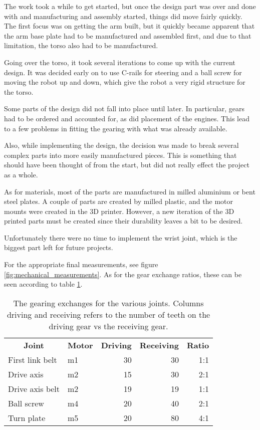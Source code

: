 The work took a while to get started, but once the design part was over and done with and manufacturing and assembly started, things did move fairly quickly. The first focus was on getting the arm built, but it quickly became apparent that the arm base plate had to be manufactured and assembled first, and due to that limitation, the torso also had to be manufactured.

Going over the torso, it took several iterations to come up with the current design. It was decided early on to use C-rails for steering and a ball screw for moving the robot up and down, which give the robot a very rigid structure for the torso. 

Some parts of the design did not fall into place until later. In particular, gears had to be ordered and accounted for, as did placement of the engines. This lead to a few problems in fitting the gearing with what was already available.

Also, while implementing the design, the decision was made to break several complex parts into more easily manufactured pieces. This is something that should have been thought of from the start, but did not really effect the project as a whole.

As for materials, most of the parts are manufactured in milled aluminium or bent steel plates. A couple of parts are created by milled plastic, and the motor mounts were created in the 3D printer. However, a new iteration of the 3D printed parts must be created since their durability leaves a bit to be desired.

Unfortunately there were no time to implement the wrist joint, which is the biggest part left for future projects.

For the appropriate final measurements, see figure \ref{fig:mechanical_measurements}. As for the gear exchange ratios, these can be seen according to table \ref{table:gearing}.

\begin{table}[!ht]
    \centering
    \begin{tabular}{l l r r r}
        \multicolumn{1}{c}{\bfseries Joint} & \multicolumn{1}{c}{\bfseries Motor} & \multicolumn{1}{c}{\bfseries Driving} & \multicolumn{1}{c}{\bfseries Receiving} & \multicolumn{1}{c}{\bfseries Ratio} \\ %
        First link belt & m1 & 30 & 30 & 1:1 \\
        Drive axis & m2 & 15 & 30 & 2:1 \\
        Drive axis belt & m2 & 19 & 19 & 1:1 \\
        Ball screw & m4 & 20 & 40 & 2:1 \\
        Turn plate & m5 & 20 & 80 & 4:1
    \end{tabular}
    \caption{The gearing exchanges for the various joints. Columns driving and receiving refers to the number of teeth on the driving gear vs the receiving gear.}
    \label{table:gearing}
\end{table}

